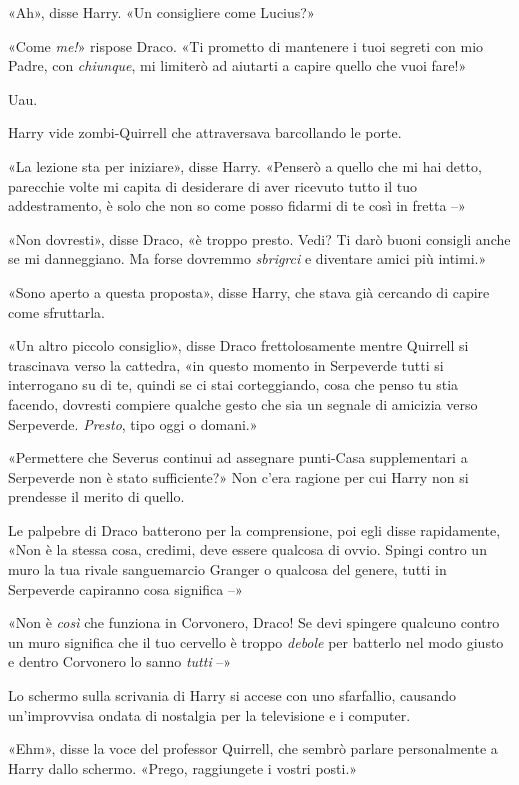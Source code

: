 «Ah», disse Harry. «Un consigliere come Lucius?»

«Come \textit{me!}» rispose Draco. «Ti prometto di mantenere i tuoi segreti con mio Padre, con \textit{chiunque}, mi limiterò ad aiutarti a capire quello che vuoi fare!»

Uau.

Harry vide zombi-Quirrell che attraversava barcollando le porte.

«La lezione sta per iniziare», disse Harry. «Penserò a quello che mi hai detto, parecchie volte mi capita di desiderare di aver ricevuto tutto il tuo addestramento, è solo che non so come posso fidarmi di te così in fretta –»

«Non dovresti», disse Draco, «è troppo presto. Vedi? Ti darò buoni consigli anche se mi danneggiano. Ma forse dovremmo \textit{sbrigrci} e diventare amici più intimi.»

«Sono aperto a questa proposta», disse Harry, che stava già cercando di capire come sfruttarla.

«Un altro piccolo consiglio», disse Draco frettolosamente mentre Quirrell si trascinava verso la cattedra, «in questo momento in Serpeverde tutti si interrogano su di te, quindi se ci stai corteggiando, cosa che penso tu stia facendo, dovresti compiere qualche gesto che sia un segnale di amicizia verso Serpeverde. \textit{Presto}, tipo oggi o domani.»

«Permettere che Severus continui ad assegnare punti-Casa supplementari a Serpeverde non è stato sufficiente?» Non c’era ragione per cui Harry non si prendesse il merito di quello.

Le palpebre di Draco batterono per la comprensione, poi egli disse rapidamente, «Non è la stessa cosa, credimi, deve essere qualcosa di ovvio. Spingi contro un muro la tua rivale sanguemarcio Granger o qualcosa del genere, tutti in Serpeverde capiranno cosa significa –»

«Non è \textit{così} che funziona in Corvonero, Draco! Se devi spingere qualcuno contro un muro significa che il tuo cervello è troppo \textit{debole} per batterlo nel modo giusto e dentro Corvonero lo sanno \textit{tutti} –»

Lo schermo sulla scrivania di Harry si accese con uno sfarfallio, causando un’improvvisa ondata di nostalgia per la televisione e i computer.

«Ehm», disse la voce del professor Quirrell, che sembrò parlare personalmente a Harry dallo schermo. «Prego, raggiungete i vostri posti.»


